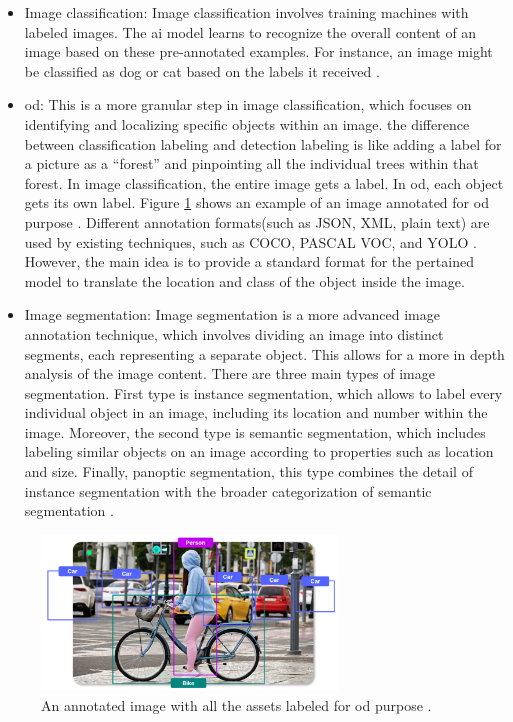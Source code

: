 \begin{itemize}
    \item Image classification: Image classification involves training machines with labeled images. The \gls{ai} model learns to recognize the overall content of an image based on these pre-annotated examples. For instance, an image might be classified as dog or cat based on the labels it received \cite{Annotation_Tech}. 
    \item \gls{od}: This is a more granular step in image classification, which focuses on identifying and localizing specific objects within an image. the difference between  classification labeling and detection labeling is like adding a label for a picture as a “forest” and pinpointing all the individual trees within that forest. In image classification, the entire image gets a label. In \gls{od}, each object gets its own label. Figure \ref{OD_Labeling} shows an example of an image annotated for \gls{od} purpose \cite{Annotation_Tech}. Different annotation formats(such as JSON, XML, plain text) are used by existing techniques, such as COCO, PASCAL VOC, and YOLO \cite{oD_Review}. However, the main idea is to provide a standard format for the pertained model to translate the location and class of the object inside the image.
    \item Image segmentation: Image segmentation is a more advanced image annotation technique, which involves dividing an image into distinct segments, each representing a separate object. This allows for a more in depth analysis of the image content. There are three main types of image segmentation. First type is instance segmentation, which allows to label every individual object in an image, including its location and number within the image. Moreover, the second type is semantic segmentation, which includes labeling similar objects on an image according to properties such as location and size. Finally, panoptic segmentation, this type combines the detail of instance segmentation with the broader categorization of semantic segmentation \cite{Annotation_Tech}.
\end{itemize}

\begin{figure}[!htb] 
    \centering
    \includegraphics[width=0.7\textwidth]{Figures/OD_Labeling.png}
    \caption{An annotated image with all the assets labeled for \gls{od} purpose \cite{Annotation_Tech}.}
    \label{OD_Labeling}
\end{figure}



